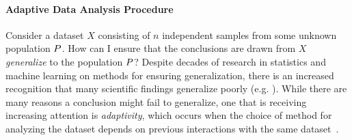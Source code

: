  \paragraph{Adaptive Data Analysis Procedure}
 
 
 
 Consider a dataset $X$ consisting of $n$ independent samples from some unknown population $P$. How can I ensure that the conclusions are drawn from $X$ \emph{generalize} to the population $P$? Despite decades of research in statistics and machine learning on methods for ensuring generalization, there is an increased recognition that many scientific findings generalize poorly (e.g. 
 \cite{Ioannidis05,GelmanL13}
 ). While there are many reasons a conclusion might fail to generalize, one that is receiving increasing attention is \emph{adaptivity}, which occurs when the choice of method for analyzing the dataset depends on previous interactions with the same dataset~\cite{GelmanL13}.
 
